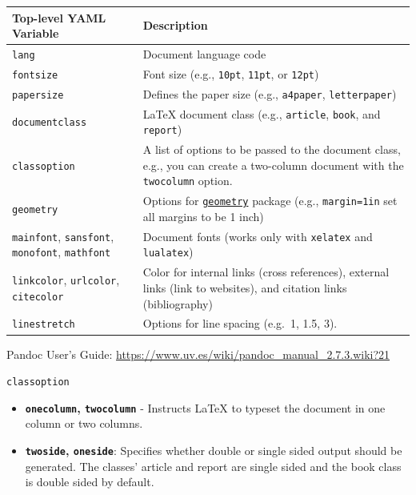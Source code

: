 \documentclass[
  a4paper,
  twoside,
  openright]{book}
\theoremstyle{definition}
\theoremstyle{definition}
\theoremstyle{definition}
\theoremstyle{definition}
\theoremstyle{remark}
\begin{document}
\begin{itemize}
  \begin{longtable}[]{@{}
    >{\raggedright\arraybackslash}p{}
    >{\raggedright\arraybackslash}p{}@{}}
  \toprule\noalign{}
  \begin{minipage}[b]{\linewidth}\raggedright
  Top-level YAML Variable
  \end{minipage} & \begin{minipage}[b]{\linewidth}\raggedright
  Description
  \end{minipage} \\
  \midrule\noalign{}
  \endhead
  \bottomrule\noalign{}
  \endlastfoot
  \texttt{lang} & Document language code \\
  \texttt{fontsize} & Font size (e.g., \texttt{10pt}, \texttt{11pt}, or \texttt{12pt}) \\
  \texttt{papersize} & Defines the paper size (e.g., \texttt{a4paper}, \texttt{letterpaper}) \\
  \texttt{documentclass} & LaTeX document class (e.g., \texttt{article}, \texttt{book}, and \texttt{report}) \\
  \texttt{classoption} & A list of options to be passed to the document class, e.g., you can create a two-column document with the \texttt{twocolumn} option. \\
  \texttt{geometry} & Options for \href{https://ctan.org/pkg/geometry}{\texttt{geometry}} package (e.g., \texttt{margin=1in} set all margins to be 1 inch) \\
  \texttt{mainfont}, \texttt{sansfont}, \texttt{monofont}, \texttt{mathfont} & Document fonts (works only with \texttt{xelatex} and \texttt{lualatex}) \\
  \texttt{linkcolor}, \texttt{urlcolor}, \texttt{citecolor} & Color for internal links (cross references), external links (link to websites), and citation links (bibliography) \\
  \texttt{linestretch} & Options for line spacing (e.g.~1, 1.5, 3). \\
  \end{longtable}

  Pandoc User's Guide: \url{https://www.uv.es/wiki/pandoc_manual_2.7.3.wiki?21}

  \texttt{classoption}

  \begin{itemize}
  \item
    \textbf{\texttt{onecolumn}, \texttt{twocolumn}} - Instructs LaTeX to typeset the document in one column or two columns.
  \item
    \textbf{\texttt{twoside}, \texttt{oneside}}: Specifies whether double or single sided output should be generated. The classes' article and report are single sided and the book class is double sided by default.


\end{itemize}
\end{itemize}
\end{document}
